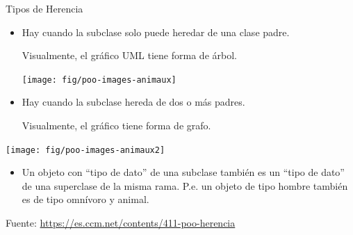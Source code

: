 \documentclass[10pt,envcountsect,spanish]{beamer}
\begin{document}
\begin{frame}{Tipos de Herencia}
\begin{itemize} 
\item Hay  cuando la subclase solo puede heredar de una clase padre. 

Visualmente, el gráfico UML tiene forma de árbol.

\centerline{\texttt{[image: fig/poo-images-animaux]}}

\item Hay  cuando la subclase hereda de dos o más padres.

Visualmente, el gráfico tiene forma de grafo.
\end{itemize}

\centerline{\texttt{[image: fig/poo-images-animaux2]}}



\begin{itemize}
\item \small Un objeto con ``tipo de dato'' de una subclase también es un ``tipo de dato'' de una superclase de la misma rama.
\small P.e. un objeto de tipo hombre también es de tipo omnívoro y animal.
\end{itemize}

\vfill

\centerline{\scriptsize Fuente: \url{https://es.ccm.net/contents/411-poo-herencia}}
\end{frame}
\end{document}
